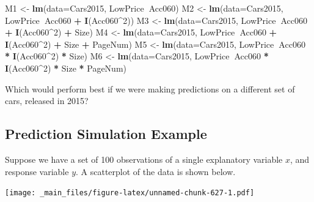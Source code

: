 \documentclass[]{book}
\newenvironment{Shaded}{\begin{snugshade}}{\end{snugshade}}
\newcommand{\KeywordTok}[1]{\textcolor[rgb]{0.13,0.29,0.53}{\textbf{#1}}}
\newcommand{\DataTypeTok}[1]{\textcolor[rgb]{0.13,0.29,0.53}{#1}}
\newcommand{\DecValTok}[1]{\textcolor[rgb]{0.00,0.00,0.81}{#1}}
\newcommand{\StringTok}[1]{\textcolor[rgb]{0.31,0.60,0.02}{#1}}
\newcommand{\OperatorTok}[1]{\textcolor[rgb]{0.81,0.36,0.00}{\textbf{#1}}}
\newcommand{\NormalTok}[1]{#1}
\begin{document}
\begin{Shaded}
\begin{Highlighting}[]
\NormalTok{M1 <-}\StringTok{ }\KeywordTok{lm}\NormalTok{(}\DataTypeTok{data=}\NormalTok{Cars2015, LowPrice}\OperatorTok{~}\NormalTok{Acc060)}
\NormalTok{M2 <-}\StringTok{ }\KeywordTok{lm}\NormalTok{(}\DataTypeTok{data=}\NormalTok{Cars2015, LowPrice}\OperatorTok{~}\NormalTok{Acc060 }\OperatorTok{+}\StringTok{ }\KeywordTok{I}\NormalTok{(Acc060}\OperatorTok{^}\DecValTok{2}\NormalTok{))}
\NormalTok{M3 <-}\StringTok{ }\KeywordTok{lm}\NormalTok{(}\DataTypeTok{data=}\NormalTok{Cars2015, LowPrice}\OperatorTok{~}\NormalTok{Acc060 }\OperatorTok{+}\StringTok{ }\KeywordTok{I}\NormalTok{(Acc060}\OperatorTok{^}\DecValTok{2}\NormalTok{) }\OperatorTok{+}\StringTok{ }\NormalTok{Size)}
\NormalTok{M4 <-}\StringTok{ }\KeywordTok{lm}\NormalTok{(}\DataTypeTok{data=}\NormalTok{Cars2015, LowPrice}\OperatorTok{~}\NormalTok{Acc060 }\OperatorTok{+}\StringTok{ }\KeywordTok{I}\NormalTok{(Acc060}\OperatorTok{^}\DecValTok{2}\NormalTok{) }\OperatorTok{+}\StringTok{ }\NormalTok{Size }\OperatorTok{+}\StringTok{ }\NormalTok{PageNum)}
\NormalTok{M5 <-}\StringTok{ }\KeywordTok{lm}\NormalTok{(}\DataTypeTok{data=}\NormalTok{Cars2015, LowPrice}\OperatorTok{~}\NormalTok{Acc060 }\OperatorTok{*}\StringTok{ }\KeywordTok{I}\NormalTok{(Acc060}\OperatorTok{^}\DecValTok{2}\NormalTok{) }\OperatorTok{*}\StringTok{ }\NormalTok{Size)}
\NormalTok{M6 <-}\StringTok{ }\KeywordTok{lm}\NormalTok{(}\DataTypeTok{data=}\NormalTok{Cars2015, LowPrice}\OperatorTok{~}\NormalTok{Acc060 }\OperatorTok{*}\StringTok{ }\KeywordTok{I}\NormalTok{(Acc060}\OperatorTok{^}\DecValTok{2}\NormalTok{) }\OperatorTok{*}\StringTok{ }\NormalTok{Size }\OperatorTok{*}\StringTok{ }\NormalTok{PageNum)}
\end{Highlighting}
\end{Shaded}

Which would perform best if we were making predictions on a different
set of cars, released in 2015?

\subsection{Prediction Simulation
Example}\label{prediction-simulation-example}

Suppose we have a set of 100 observations of a single explanatory
variable \(x\), and response variable \(y\). A scatterplot of the data
is shown below.

\texttt{[image: \_main\_files/figure-latex/unnamed-chunk-627-1.pdf]}
\end{document}

